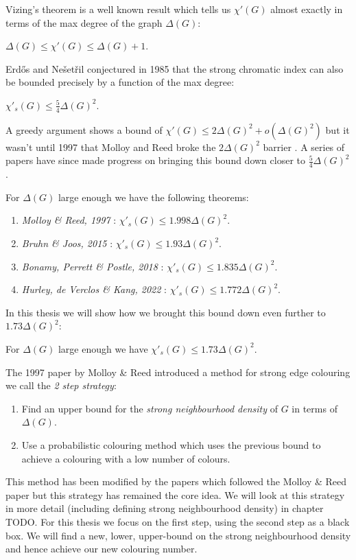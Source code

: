 Vizing's theorem is a well known result which tells us $\chi'(G)$ almost exactly in terms of
the max degree of the graph $\Delta(G)$:
\begin{knowntheorem}
    $\Delta(G) \leq \chi'(G) \leq \Delta(G) + 1$.
\end{knowntheorem}
Erd\H{o}s and Nešetřil conjectured in 1985 that
the strong chromatic index can also be bounded precisely by a function of the max degree:
\begin{conjecture}
    \label{conj:erdos-nesetril}
    $\chi'_s(G) \leq \frac{5}{4}\Delta(G)^2$.
\end{conjecture}
A greedy argument shows a bound of $\chi'(G) \leq 2\Delta(G)^2 + o(\Delta(G)^2)$ but it wasn't until
1997 that Molloy and Reed broke the $2\Delta(G)^2$ barrier \cite{molloyBoundStrongChromatic1997}.
A series of papers have since made progress on bringing this bound down closer to $\frac{5}{4}\Delta(G)^2$.

For $\Delta(G)$ large enough we have the following theorems:
\begin{enumerate}
  \item \textit{Molloy \& Reed, 1997} \cite{molloyBoundStrongChromatic1997}:
        $\chi'_s(G) \leq 1.998\Delta(G)^2$.
  \item \textit{Bruhn \& Joos, 2015} \cite{bruhnStrongerBoundStrong2018}:
        $\chi'_s(G) \leq 1.93\Delta(G)^2$.
  \item \textit{Bonamy, Perrett \& Postle, 2018} \cite{bonamyColouringGraphsSparse2018}:
        $\chi'_s(G) \leq 1.835\Delta(G)^2$.
  \item \textit{Hurley, de Verclos \& Kang, 2022} \cite{hurleyImprovedProcedureColouring2022}:
        $\chi'_s(G) \leq 1.772\Delta(G)^2$.
\end{enumerate}

In this thesis we will show how we brought this bound down even further to $1.73\Delta(G)^2$:
\begin{theorem}
    For $\Delta(G)$ large enough we have
    $\chi'_s(G) \leq 1.73\Delta(G)^2$.
\end{theorem}

The 1997 paper by Molloy \& Reed introduced a method for strong edge colouring we call the
\textit{2 step strategy}:
\begin{enumerate}
    \item Find an upper bound for the \textit{strong neighbourhood density} of $G$ in terms of
        $\Delta(G)$.
    \item Use a probabilistic colouring method which uses the previous bound to achieve a colouring
        with a low number of colours.
\end{enumerate}
This method has been modified by the papers which followed the Molloy \& Reed paper but this
strategy has remained the core idea. We will look at this strategy in more detail (including
defining strong neighbourhood density) in chapter TODO.
For this thesis we focus on the first step, using the second step as a black box. We will
find a new, lower, upper-bound on the strong neighbourhood density and hence achieve our
new colouring number.

